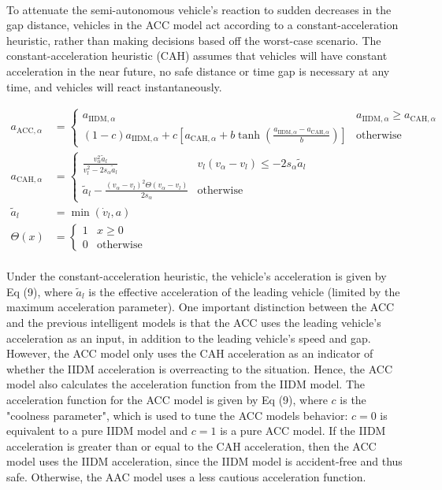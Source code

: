 \documentclass[12pt]{article}
\begin{document}
\paragraph{}
To attenuate the semi-autonomous vehicle's reaction to sudden decreases in the gap distance, vehicles in the ACC model act according to a constant-acceleration heuristic, rather than making decisions based off the worst-case scenario.  The constant-acceleration heuristic (CAH) assumes that vehicles will have constant acceleration in the near future, no safe distance or time gap is necessary at any time, and vehicles will react instantaneously.
\begin{mymathbox}[ams gather, title=ACC Governing Functions, colframe=blue!30!black]
  \begin{align}
  a_{\text{ACC},\alpha}&= 
  \begin{cases}
  a_{\text{IIDM},\alpha} & a_{\text{IIDM},\alpha} \ge a_{\text{CAH},\alpha}\\
  (1-c)a_{\text{IIDM},\alpha} + c\left[a_{\text{CAH},\alpha} + b \tanh(\frac{a_{\text{IIDM},\alpha}-a_{\text{CAH},\alpha}}{b}) \right] & \text{otherwise}
  \end{cases}\\
  a_{\text{CAH},\alpha}&= 
  \begin{cases}
  \frac{v_\alpha^2\tilde{a}_l}{v_l^2 - 2 s_\alpha\tilde{a}_l} & v_l(v_\alpha-v_l) \le -2s_\alpha\tilde{a}_l\\
  \tilde{a}_l - \frac{(v_\alpha-v_l)^2 \Theta (v_\alpha-v_l)}{2s_\alpha} & \text{otherwise}
  \end{cases}\\
  \tilde{a}_l &= \min(\dot{v}_l, a)\\
   \Theta (x)&= 
   \begin{cases}
   1 & x\geq 0\\
   0 & \text{otherwise}
   \end{cases}
   \end{align}
\end{mymathbox}
\paragraph{}
Under the constant-acceleration heuristic, the vehicle's acceleration is given by Eq (9), where $\tilde{a}_l$ is the effective acceleration of the leading vehicle (limited by the maximum acceleration parameter). One important distinction between the ACC and the previous intelligent models is that the ACC uses the leading vehicle's acceleration as an input, in addition to the leading vehicle's speed and gap. However, the ACC model only uses the CAH acceleration as an indicator of whether the IIDM acceleration is overreacting to the situation.  Hence, the ACC model also calculates the acceleration function from the IIDM model.  The acceleration function for the ACC model is given by Eq (9), where $c$ is the "coolness parameter", which is used to tune the ACC models behavior: $c=0$ is equivalent to a pure IIDM model and $c=1$ is a pure ACC model.  If the IIDM acceleration is greater than or equal to the CAH acceleration, then the ACC model uses the IIDM acceleration, since the IIDM model is accident-free and thus safe.  Otherwise, the AAC model uses a less cautious acceleration function.
\end{document}
